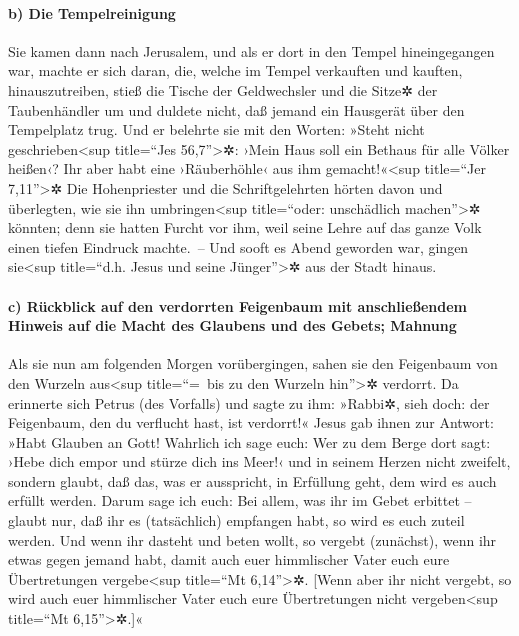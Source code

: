 \hypertarget{b-die-tempelreinigung}{%
\paragraph{b) Die Tempelreinigung}\label{b-die-tempelreinigung}}

 Sie kamen dann nach Jerusalem, und als er dort in den
Tempel hineingegangen war, machte er sich daran, die, welche im Tempel
verkauften und kauften, hinauszutreiben, stieß die Tische der
Geldwechsler und die Sitze✲ der Taubenhändler um  und
duldete nicht, daß jemand ein Hausgerät über den Tempelplatz trug.
 Und er belehrte sie mit den Worten: »Steht nicht
geschrieben\textless sup title=``Jes 56,7''\textgreater✲: ›Mein Haus
soll ein Bethaus für alle Völker heißen‹? Ihr aber habt eine
›Räuberhöhle‹ aus ihm gemacht!«\textless sup title=``Jer
7,11''\textgreater✲  Die Hohenpriester und die
Schriftgelehrten hörten davon und überlegten, wie sie ihn
umbringen\textless sup title=``oder: unschädlich machen''\textgreater✲
könnten; denn sie hatten Furcht vor ihm, weil seine Lehre auf das ganze
Volk einen tiefen Eindruck machte.~--  Und sooft es Abend
geworden war, gingen sie\textless sup title=``d.h. Jesus und seine
Jünger''\textgreater✲ aus der Stadt hinaus.

\hypertarget{c-ruxfcckblick-auf-den-verdorrten-feigenbaum-mit-anschlieuxdfendem-hinweis-auf-die-macht-des-glaubens-und-des-gebets-mahnung}{%
\paragraph{c) Rückblick auf den verdorrten Feigenbaum mit anschließendem
Hinweis auf die Macht des Glaubens und des Gebets;
Mahnung}\label{c-ruxfcckblick-auf-den-verdorrten-feigenbaum-mit-anschlieuxdfendem-hinweis-auf-die-macht-des-glaubens-und-des-gebets-mahnung}}

 Als sie nun am folgenden Morgen vorübergingen, sahen sie
den Feigenbaum von den Wurzeln aus\textless sup title=``=~bis zu den
Wurzeln hin''\textgreater✲ verdorrt.  Da erinnerte sich
Petrus (des Vorfalls) und sagte zu ihm: »Rabbi✲, sieh doch: der
Feigenbaum, den du verflucht hast, ist verdorrt!«  Jesus
gab ihnen zur Antwort: »Habt Glauben an Gott!  Wahrlich
ich sage euch: Wer zu dem Berge dort sagt: ›Hebe dich empor und stürze
dich ins Meer!‹ und in seinem Herzen nicht zweifelt, sondern glaubt, daß
das, was er ausspricht, in Erfüllung geht, dem wird es auch erfüllt
werden.  Darum sage ich euch: Bei allem, was ihr im Gebet
erbittet -- glaubt nur, daß ihr es (tatsächlich) empfangen habt, so wird
es euch zuteil werden.  Und wenn ihr dasteht und beten
wollt, so vergebt (zunächst), wenn ihr etwas gegen jemand habt, damit
auch euer himmlischer Vater euch eure Übertretungen vergebe\textless sup
title=``Mt 6,14''\textgreater✲.  {[}Wenn aber ihr nicht
vergebt, so wird auch euer himmlischer Vater euch eure Übertretungen
nicht vergeben\textless sup title=``Mt 6,15''\textgreater✲.{]}«

